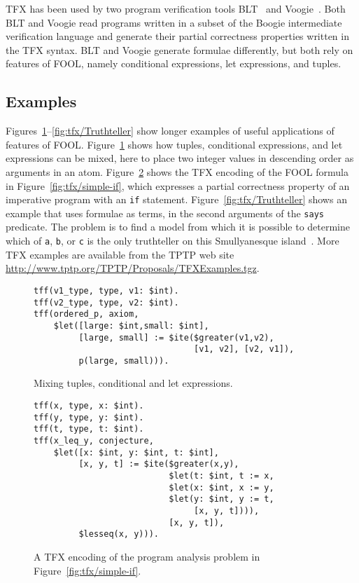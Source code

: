 TFX has been used by two program verification tools BLT~\cite{CF-iFM17} and
Voogie~\cite{KKV18}. 
Both BLT and Voogie read programs written in a subset of the Boogie 
intermediate verification language and generate their partial correctness 
properties written in the TFX syntax. 
BLT and Voogie generate formulae differently, but both rely on features of 
FOOL, namely conditional expressions, let expressions, and tuples.

\subsection{Examples}
\label{sec:tfx/Examples}

Figures~\ref{fig:tfx/TupleConditionalLet}--\ref{fig:tfx/Truthteller} show longer examples of
useful applications of features of FOOL. 
Figure~\ref{fig:tfx/TupleConditionalLet} shows how tuples, conditional expressions, 
and let expressions can be mixed, here to place two integer values in 
descending order as arguments in an atom. 
Figure~\ref{fig:tfx/LetITE} shows the TFX encoding of the FOOL formula in 
Figure~\ref{fig:tfx/simple-if}, which expresses a partial correctness property 
of an imperative program with an \texttt{if} statement. 
Figure~\ref{fig:tfx/Truthteller} shows an example that uses formulae as terms, in 
the second arguments of the \lstinline'says' predicate. 
The problem is to find a model from which it is possible to determine which 
of \lstinline'a', \lstinline'b', or \lstinline'c' is the only truthteller on this Smullyanesque 
island~\cite{Smu78}. 
More TFX examples are available from the TPTP web site 
\url{http://www.tptp.org/TPTP/Proposals/TFXExamples.tgz}.

\begin{figure}[h]
\begin{lstlisting}[language=tptp]
tff(v1_type, type, v1: $int).
tff(v2_type, type, v2: $int).
tff(ordered_p, axiom,
    $let([large: $int,small: $int],
         [large, small] := $ite($greater(v1,v2),
                                [v1, v2], [v2, v1]),
         p(large, small))).
\end{lstlisting}
\caption{Mixing tuples, conditional and let expressions.}
\label{fig:tfx/TupleConditionalLet}
\end{figure}

\begin{figure}[h]
\begin{lstlisting}[language=tptp]
tff(x, type, x: $int).
tff(y, type, y: $int).
tff(t, type, t: $int).
tff(x_leq_y, conjecture,
    $let([x: $int, y: $int, t: $int],
         [x, y, t] := $ite($greater(x,y),
                           $let(t: $int, t := x,
                           $let(x: $int, x := y,
                           $let(y: $int, y := t,
                                [x, y, t]))),
                           [x, y, t]),
         $lesseq(x, y))).
\end{lstlisting}
\caption{A TFX encoding of the program analysis problem in
Figure~\ref{fig:tfx/simple-if}.}
\label{fig:tfx/LetITE}
\end{figure}

